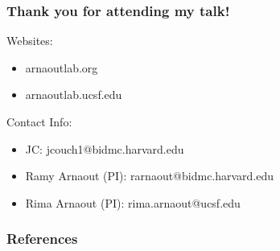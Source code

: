 \documentclass[8pt,aspectratio=169]{beamer}
\begin{document}
\begin{frame}
\frametitle{Thank you for attending my talk!}


\vspace{0.02\textwidth}

Websites:
\begin{itemize}
    \item arnaoutlab.org
    \item arnaoutlab.ucsf.edu
\end{itemize}

\vspace{0.02\textwidth}

Contact Info:
\begin{itemize}
    \item JC: jcouch1@bidmc.harvard.edu
    \item Ramy Arnaout (PI): rarnaout@bidmc.harvard.edu
    \item Rima Arnaout (PI): rima.arnaout@ucsf.edu
\end{itemize}
    
    
\end{frame}

\begin{frame}
\frametitle{References}
{\tiny
\footnotesize
}
\end{frame}
\end{document}

